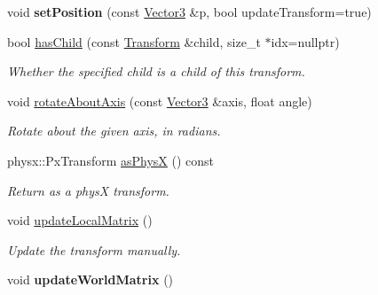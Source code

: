 \begin{Indent}
\begin{DoxyCompactItemize}
\mbox{\label{classrev_1_1_transform_a551158784f98bc730f94878142d81e42}} 
void {\bfseries set\+Position} (const \mbox{\hyperlink{classrev_1_1_vector}{Vector3}} \&p, bool update\+Transform=true)
\item 
bool \mbox{\hyperlink{classrev_1_1_transform_a1d5fb768c903b76184a9f9e7aac4fc21}{has\+Child}} (const \mbox{\hyperlink{classrev_1_1_transform}{Transform}} \&child, size\+\_\+t $\ast$idx=nullptr)
\begin{DoxyCompactList}\small\item\em Whether the specified child is a child of this transform. \end{DoxyCompactList}\item 
\mbox{\label{classrev_1_1_transform_a9f301db1c301a30fe0c769fe7a17add9}} 
void \mbox{\hyperlink{classrev_1_1_transform_a9f301db1c301a30fe0c769fe7a17add9}{rotate\+About\+Axis}} (const \mbox{\hyperlink{classrev_1_1_vector}{Vector3}} \&axis, float angle)
\begin{DoxyCompactList}\small\item\em Rotate about the given axis, in radians. \end{DoxyCompactList}\item 
\mbox{\label{classrev_1_1_transform_aae9e11c38c39350a69f49f34d7a41ecd}} 
physx\+::\+Px\+Transform \mbox{\hyperlink{classrev_1_1_transform_aae9e11c38c39350a69f49f34d7a41ecd}{as\+PhysX}} () const
\begin{DoxyCompactList}\small\item\em Return as a physX transform. \end{DoxyCompactList}\item 
void \mbox{\hyperlink{classrev_1_1_transform_ac866da54728977f841fd7536a2badc17}{update\+Local\+Matrix}} ()
\begin{DoxyCompactList}\small\item\em Update the transform manually. \end{DoxyCompactList}\item 
\mbox{\label{classrev_1_1_transform_a7f8920a935a12e3002ad32779107d49e}} 
void {\bfseries update\+World\+Matrix} ()
\item 
\mbox{\label{classrev_1_1_transform_aeb3a1d98c804b628c9c43671a5be3722}} 

\end{DoxyCompactItemize}
\end{Indent}
